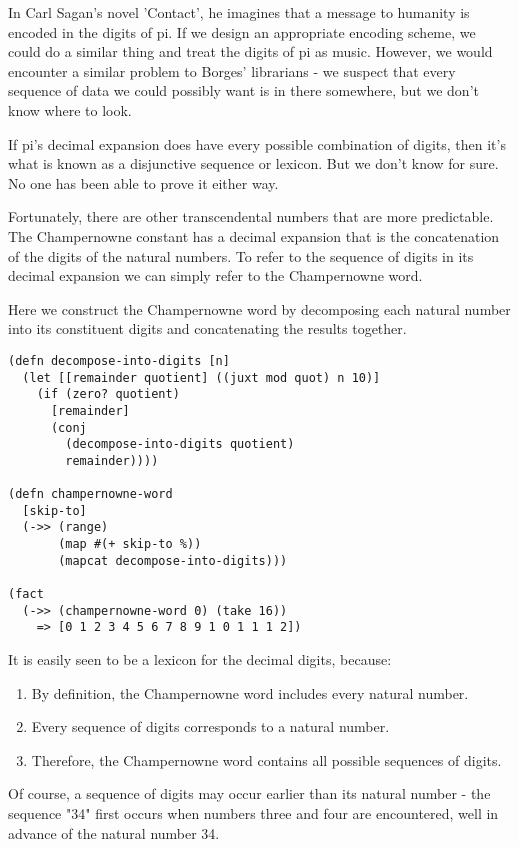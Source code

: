 \documentclass[numbers, preprint]{sigplanconf}
\begin{document}
In Carl Sagan's novel 'Contact'\cite{Contact}, he imagines that a message to humanity is encoded in the digits of pi.
If we design an appropriate encoding scheme, we could do a similar thing and treat the digits of pi as music. However,
we would encounter a similar problem to Borges' librarians - we suspect that every sequence of data we could possibly want
is in there somewhere, but we don't know where to look.

If pi's decimal expansion does have every possible combination of digits, then it's what is known as a disjunctive
sequence or lexicon. But we don't know for sure. No one has been able to prove it either way.

Fortunately, there are other transcendental numbers that are more predictable. The Champernowne constant has a
decimal expansion that is the concatenation of the digits of the natural numbers. To refer to the sequence of digits
in its decimal expansion we can simply refer to the Champernowne word.

Here we construct the Champernowne word by decomposing each natural number into its constituent digits and concatenating
the results together.

\begin{verbatim}
(defn decompose-into-digits [n]
  (let [[remainder quotient] ((juxt mod quot) n 10)]
    (if (zero? quotient)
      [remainder]
      (conj
        (decompose-into-digits quotient)
        remainder))))

(defn champernowne-word
  [skip-to]
  (->> (range)
       (map #(+ skip-to %))
       (mapcat decompose-into-digits)))

(fact
  (->> (champernowne-word 0) (take 16))
    => [0 1 2 3 4 5 6 7 8 9 1 0 1 1 1 2])
\end{verbatim}

It is easily seen to be a lexicon for the decimal digits, because:
\begin{enumerate}
    \item By definition, the Champernowne word includes every natural number.
    \item Every sequence of digits corresponds to a natural number.
    \item Therefore, the Champernowne word contains all possible sequences of digits.
\end{enumerate}
Of course, a sequence of digits may occur earlier than its natural number - the sequence "34" first occurs when numbers three and
four are encountered, well in advance of the natural number 34.
\end{document}
